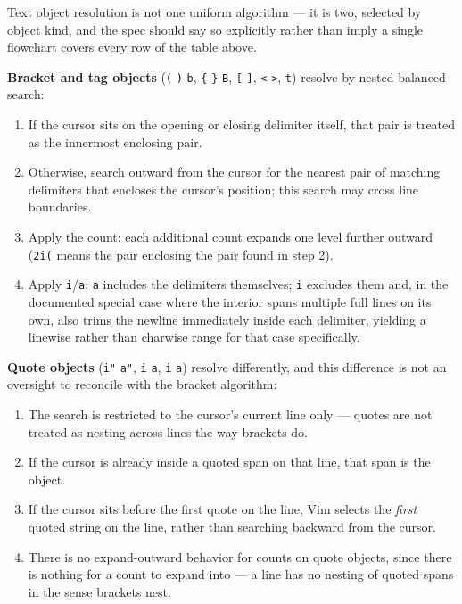 \documentclass[11pt]{article}
\providecommand{\tightlist}{%
  \setlength{\itemsep}{0pt}\setlength{\parskip}{0pt}}
\begin{document}
Text object resolution is not one uniform algorithm --- it is two, selected
by object kind, and the spec should say so explicitly rather than imply a
single flowchart covers every row of the table above.

\textbf{Bracket and tag objects} (\texttt{(} \texttt{)} \texttt{b}, \texttt{\{} \texttt{\}} \texttt{B}, \texttt{{[}} \texttt{{]}}, \texttt{\textless{}} \texttt{\textgreater{}}, \texttt{t})
resolve by nested balanced search:

\begin{enumerate}
\def\labelenumi{\arabic{enumi}.}
\tightlist
\item
  If the cursor sits on the opening or closing delimiter itself, that pair
  is treated as the innermost enclosing pair.
\item
  Otherwise, search outward from the cursor for the nearest pair of
  matching delimiters that encloses the cursor's position; this search may
  cross line boundaries.
\item
  Apply the count: each additional count expands one level further
  outward (\texttt{2i(} means the pair enclosing the pair found in step 2).
\item
  Apply \texttt{i}/\texttt{a}: \texttt{a} includes the delimiters themselves; \texttt{i} excludes them
  and, in the documented special case where the interior spans multiple
  full lines on its own, also trims the newline immediately inside each
  delimiter, yielding a linewise rather than charwise range for that case
  specifically.
\end{enumerate}

\textbf{Quote objects} (\texttt{i"} \texttt{a"}, \texttt{i\textquotesingle{}} \texttt{a\textquotesingle{}}, \texttt{i\textasciigrave{}} \texttt{a\textasciigrave{}}) resolve
differently, and this difference is not an oversight to reconcile with the
bracket algorithm:

\begin{enumerate}
\def\labelenumi{\arabic{enumi}.}
\tightlist
\item
  The search is restricted to the cursor's current line only --- quotes are
  not treated as nesting across lines the way brackets do.
\item
  If the cursor is already inside a quoted span on that line, that span is
  the object.
\item
  If the cursor sits before the first quote on the line, Vim selects the
  \emph{first} quoted string on the line, rather than searching backward from
  the cursor.
\item
  There is no expand-outward behavior for counts on quote objects, since
  there is nothing for a count to expand into --- a line has no nesting of
  quoted spans in the sense brackets nest.
\end{enumerate}
\end{document}
